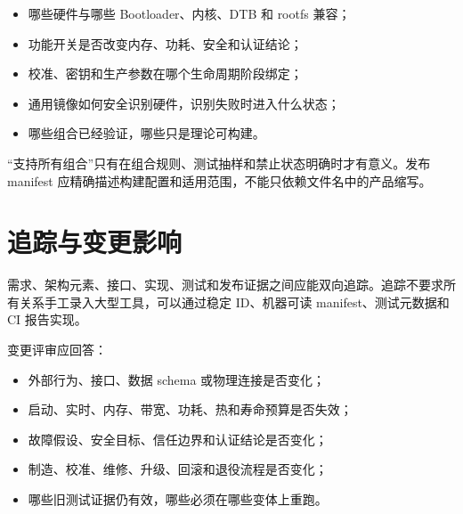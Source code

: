 \begin{itemize}
  \item 哪些硬件与哪些 Bootloader、内核、DTB 和 rootfs 兼容；
  \item 功能开关是否改变内存、功耗、安全和认证结论；
  \item 校准、密钥和生产参数在哪个生命周期阶段绑定；
  \item 通用镜像如何安全识别硬件，识别失败时进入什么状态；
  \item 哪些组合已经验证，哪些只是理论可构建。
\end{itemize}

“支持所有组合”只有在组合规则、测试抽样和禁止状态明确时才有意义。发布 manifest 应精确描述构建配置和适用范围，不能只依赖文件名中的产品缩写。

\section{追踪与变更影响}

需求、架构元素、接口、实现、测试和发布证据之间应能双向追踪。追踪不要求所有关系手工录入大型工具，可以通过稳定 ID、机器可读 manifest、测试元数据和 CI 报告实现。

\begin{center}
\end{center}

变更评审应回答：

\begin{itemize}
  \item 外部行为、接口、数据 schema 或物理连接是否变化；
  \item 启动、实时、内存、带宽、功耗、热和寿命预算是否失效；
  \item 故障假设、安全目标、信任边界和认证结论是否变化；
  \item 制造、校准、维修、升级、回滚和退役流程是否变化；
  \item 哪些旧测试证据仍有效，哪些必须在哪些变体上重跑。
\end{itemize}

